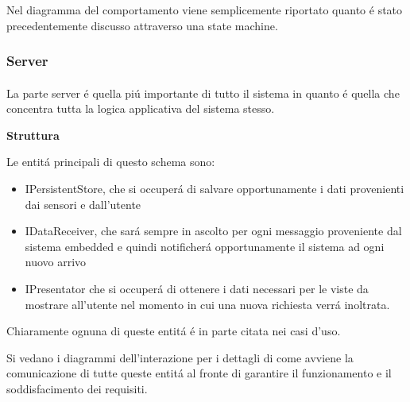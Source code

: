 Nel diagramma del comportamento viene semplicemente riportato quanto \'e stato precedentemente discusso attraverso una state machine.

\newpage

\subsubsection{Server}

\paragraph{}La parte server \'e quella pi\'u importante di tutto il sistema in quanto \'e quella che concentra tutta la logica applicativa del sistema stesso.

\begin{center}
\textbf{Struttura}
\end{center}

Le entit\'a principali di questo schema sono:
\begin{itemize}
  \item IPersistentStore, che si occuper\'a di salvare opportunamente i dati provenienti dai sensori e dall'utente
  \item IDataReceiver, che sar\'a sempre in ascolto per ogni messaggio proveniente dal sistema embedded e quindi notificher\'a opportunamente il sistema ad ogni nuovo arrivo
  \item IPresentator che si occuper\'a di ottenere i dati necessari per le viste da mostrare all'utente nel momento in cui una nuova richiesta verr\'a inoltrata.
\end{itemize}

Chiaramente ognuna di queste entit\'a \'e in parte citata nei casi d'uso.

Si vedano i diagrammi dell'interazione per i dettagli di come avviene la comunicazione di tutte queste entit\'a al fronte di garantire il funzionamento e il soddisfacimento dei requisiti.



